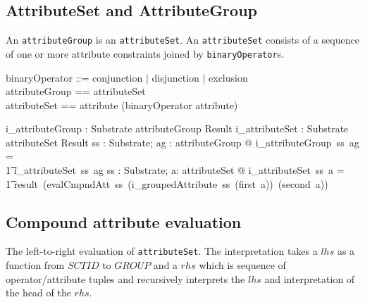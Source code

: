 \documentclass{article}
\def\spec#1{{\tt #1}}
\begin{document}
\subsection{AttributeSet and AttributeGroup}
An \spec{attributeGroup} is an \spec{attributeSet}.  An \spec{attributeSet} consists of a sequence of one or more attribute constraints joined by \spec{binaryOperator}s.


\begin{zed}
binaryOperator  ::= conjunction | disjunction | exclusion \\
attributeGroup == attributeSet \\
attributeSet == attribute \cross \seq (binaryOperator \cross attribute) 
\end{zed}

\begin{gendef}
   i\_attributeGroup : Substrate \pfun attributeGroup \pfun Result 
\also
   i\_attributeSet : Substrate \pfun attributeSet \pfun Result 
\where
\forall ss : Substrate; ag : attributeGroup @ i\_attributeGroup~ss~ag = \\
\t1 i\_attributeSet~ss~ag
\also
\forall ss : Substrate; a: attributeSet @ i\_attributeSet~ss~a = \\
\t1 result~(evalCmpndAtt~ss~(i\_groupedAttribute~ss~(first~a))~(second~a))
\end{gendef}

\subsection{Compound attribute evaluation}
The left-to-right evaluation of \spec{attributeSet}.  The interpretation takes a $lhs$ as 
a function from $SCTID$ to $GROUP$ and a $rhs$ which is sequence of operator/attribute
tuples and recursively interprets the $lhs$ and interpretation of the head of the $rhs$.
\end{document}
